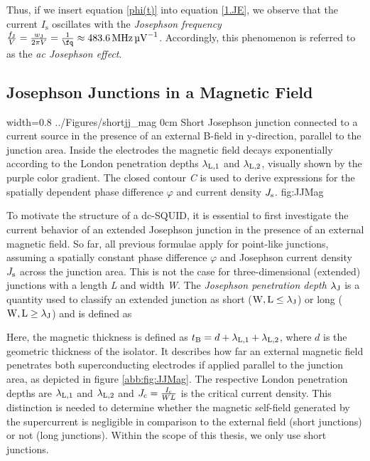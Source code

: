 Thus, if we insert equation \eqref{phi(t)} into equation \eqref{1.JE}, we observe that  the current $I_\mathrm{s}$ oscillates with the \textit{Josephson frequency} $\frac{f_\mathrm{J}}{V} = \frac{w_\mathrm{J}}{2\pi V} = \frac{1}{\unit{\fq}} \approx \SI{483.6}{\MHz\per\uV}$. Accordingly, this phenomenon is referred to as the \textit{ac Josephson effect}.



\subsection{Josephson Junctions in a Magnetic Field}\label{subsec_jjmag}

{width=0.8\textwidth}
{../Figures/shortjj_mag}
{0cm}
{Short Josephson junction connected to a current source in the presence of an external B-field in y-direction, parallel to the junction area. Inside the electrodes the magnetic field decays exponentially according to the London penetration depths $\lambda_{\rm L,1}$ and $\lambda_{\rm L,2}$, visually shown by the purple color gradient. The closed contour \textit{C} is used to derive expressions for the spatially dependent phase difference $\varphi$ and current density $J_{\rm s}$.} 
{fig:JJMag}

To motivate the structure of a dc-SQUID, it is essential to first investigate the current behavior of an extended Josephson junction in the presence of an external magnetic field. So far, all previous formulae apply for point-like junctions, assuming a spatially constant phase difference $\varphi$ and Josephson current density $J_{\rm s}$ across the junction area. This is not the case for three-dimensional (extended) junctions with a length \textit{L} and width \textit{W}. The \textit{Josephson penetration depth} $\lambda_{\rm J}$ is a quantity used to classify an extended junction as short ($\rm W,L \leq\lambda_{\rm J}$) or long ($\rm W,L \geq\lambda_{\rm J}$) and is defined as 


Here, the magnetic thickness is defined as $t_{\rm B} = d + \lambda_{\rm L,1} + \lambda_{\rm L,2}$, where $d$ is the geometric thickness of the isolator. It describes how far an external magnetic field penetrates both superconducting electrodes if applied parallel to the junction area, as depicted in figure \ref{abb:fig:JJMag}. The respective London penetration depths are $\lambda_{\rm L,1}$ and $\lambda_{\rm L,2}$ and $J_{\rm c} = \frac{I_{\rm c}}{WL}$ is the critical current density.
This distinction is needed to determine whether the magnetic self-field generated by the supercurrent is negligible in comparison to the external field (short junctions) or not (long junctions). Within the scope of this thesis, we only use short junctions.  

